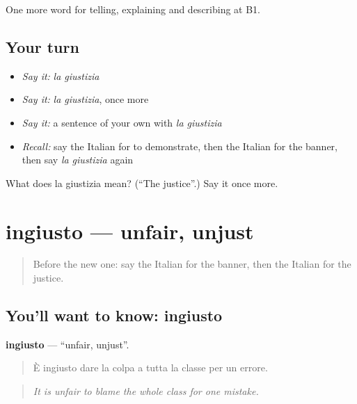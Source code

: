 \begin{grammarlens}[title={What you've built}]
One more word for telling, explaining and describing at B1.
\end{grammarlens}

\subsection*{Your turn}
\begin{itemize}
\raggedright
  \item \emph{Say it:} \emph{la giustizia}
  \item \emph{Say it:} \emph{la giustizia}, once more
  \item \emph{Say it:} a sentence of your own with \emph{la giustizia}
  \item \emph{Recall:} say the Italian for to demonstrate, then the Italian for the banner, then say \emph{la giustizia} again
\end{itemize}

\begin{tcolorbox}[breakable,colback=teal!4,colframe=teal!35!black,title={Before you move on}]
What does la giustizia mean? (\textquotedblleft{}The justice\textquotedblright{}.) Say it once more.
\end{tcolorbox}
\section[ingiusto]{ingiusto — unfair, unjust}

\label{lesson:IT-C365-ingiusto}



\begin{quote}
Before the new one: say the Italian for the banner, then the Italian for the justice.
\end{quote}

\subsection*{You'll want to know: ingiusto}
\textbf{ingiusto} — \textquotedblleft{}unfair, unjust\textquotedblright{}.

\begin{quote}
È ingiusto dare la colpa a tutta la classe per un errore.
\end{quote}

\begin{quote}
\emph{It is unfair to blame the whole class for one mistake.}
\end{quote}

